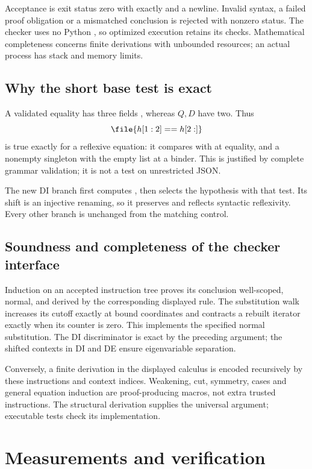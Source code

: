 Acceptance is exit status zero with exactly  and a newline.
Invalid syntax, a failed proof obligation or a mismatched conclusion
is rejected with nonzero status. The checker uses no Python
, so optimized execution retains its checks.
Mathematical completeness concerns finite derivations with unbounded
resources; an actual process has stack and memory limits.

\subsection{Why the short base test is exact}

A validated equality has three fields \file{["=", r, s]}, whereas
\(Q,D\) have two. Thus
\[
                       \file{h[1:2] == h[2:]}
\]
is true exactly for a reflexive equation: it compares \file{[r]}
with \file{[s]} at equality, and a nonempty singleton with the empty
list at a binder. This is justified by complete grammar validation;
it is not a test on unrestricted JSON.

The new DI branch first computes ,
then selects the hypothesis with that test. Its shift is an injective
renaming, so it preserves and reflects syntactic reflexivity. Every
other branch is unchanged from the matching control.

\subsection{Soundness and completeness of the checker interface}

Induction on an accepted instruction tree proves its conclusion
well-scoped, normal, and derived by the corresponding displayed rule.
The substitution walk increases its cutoff exactly at bound coordinates
and contracts a rebuilt iterator exactly when its counter is zero.
This implements the specified normal substitution. The DI discriminator
is exact by the preceding argument; the shifted contexts in DI and DE
ensure eigenvariable separation.

Conversely, a finite derivation in the displayed calculus is encoded
recursively by these instructions and context indices. Weakening, cut,
symmetry, cases and general equation induction are proof-producing macros,
not extra trusted instructions. The structural derivation supplies the
universal argument; executable tests check its implementation.

\section{Measurements and verification}
\label{sec:verification}

